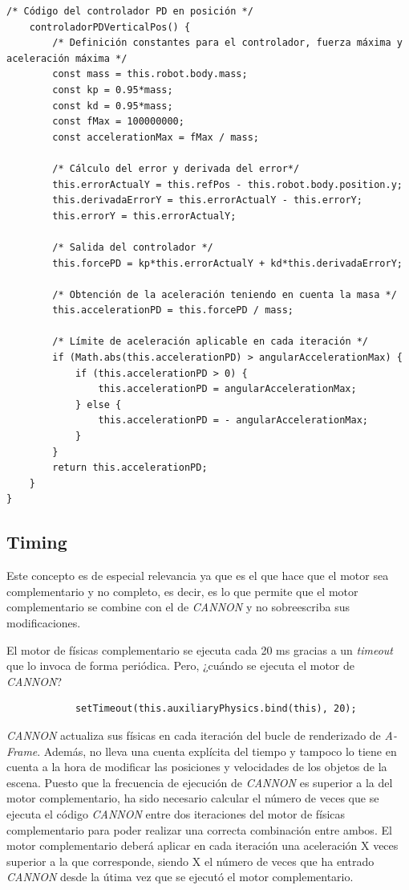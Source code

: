 \footnotesize {
\begin{verbatim}  
/* Código del controlador PD en posición */
    controladorPDVerticalPos() {
        /* Definición constantes para el controlador, fuerza máxima y                   aceleración máxima */
        const mass = this.robot.body.mass;
        const kp = 0.95*mass;
        const kd = 0.95*mass;
        const fMax = 100000000;
        const accelerationMax = fMax / mass;

        /* Cálculo del error y derivada del error*/
        this.errorActualY = this.refPos - this.robot.body.position.y;
        this.derivadaErrorY = this.errorActualY - this.errorY;
        this.errorY = this.errorActualY;
        
        /* Salida del controlador */
        this.forcePD = kp*this.errorActualY + kd*this.derivadaErrorY;
        
        /* Obtención de la aceleración teniendo en cuenta la masa */
        this.accelerationPD = this.forcePD / mass;

        /* Límite de aceleración aplicable en cada iteración */
        if (Math.abs(this.accelerationPD) > angularAccelerationMax) {
            if (this.accelerationPD > 0) {
                this.accelerationPD = angularAccelerationMax;
            } else {
                this.accelerationPD = - angularAccelerationMax;
            }
        }
        return this.accelerationPD;
    }
}
\end{verbatim}
}
\normalsize
\subsection{Timing}
Este concepto es de especial relevancia ya que es el que hace que el motor sea complementario y no completo, es decir, es lo que permite que el motor complementario se combine con el de \textit{CANNON} y no sobreescriba sus modificaciones. \newline

El motor de físicas complementario se ejecuta cada 20 ms gracias a un \textit{timeout} que lo invoca de forma periódica. Pero, ¿cuándo se ejecuta el motor de \textit{CANNON}? 

\small {
\begin{verbatim}
            setTimeout(this.auxiliaryPhysics.bind(this), 20);
\end{verbatim}
}

\normalsize
\textit{CANNON} actualiza sus físicas en cada iteración del bucle de renderizado de \textit{A-Frame}. Además, no lleva una cuenta explícita del tiempo y tampoco lo tiene en cuenta a la hora de modificar las posiciones y velocidades de los objetos de la escena. Puesto que la frecuencia de ejecución de \textit{CANNON} es superior a la del motor complementario, ha sido necesario calcular el número de veces que se ejecuta el código \textit{CANNON} entre dos iteraciones del motor de físicas complementario para poder realizar una correcta combinación entre ambos. El motor complementario deberá aplicar en cada iteración una aceleración X veces superior a la que corresponde, siendo X el número de veces que ha entrado \textit{CANNON} desde la útima vez que se ejecutó el motor complementario. \newline

